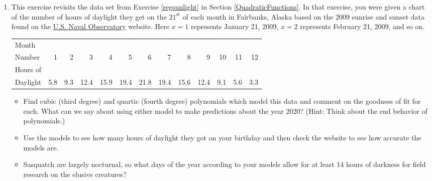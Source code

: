 \documentclass{ximera}
\begin{document}
\newpage

\begin{enumerate}
\setcounter{enumi}{\value{HW}}


\item \label{sunlighthigherorder} This exercise revisits the data set from Exercise \ref{regsunlight} in Section \ref{QuadraticFunctions}.  In that exercise, you were given a chart of the number of hours of daylight they get on the $21^{\mbox{st}}$ of each month in Fairbanks, Alaska based on the 2009 sunrise and sunset data found on the  \href{http://aa.usno.navy.mil/data/docs/RS_OneYear.php}{\underline{U.S. Naval Observatory}} website.  Here  $x = 1$ represents January 21, 2009, $x = 2$ represents February 21, 2009, and so on.  
\medskip

\small

\noindent \begin{tabular}{|l|r|r|r|r|r|r|r|r|r|r|r|r|} \hline
Month  & & & & & & & & & & & & \\
Number & 1 & 2 & 3 & 4 & 5 & 6 & 7 & 8 & 9 & 10 & 11 & 12\\ 
\hline 
Hours of  & & & & & & & & & & & & \\
Daylight & 5.8 & 9.3 & 12.4 & 15.9 & 19.4 & 21.8 & 19.4 & 15.6 & 12.4 & 9.1 & 5.6 & 3.3 \\ \hline
\end{tabular}

\normalsize

\medskip

\noindent 

\begin{itemize}

\item Find cubic (third degree) and quartic (fourth degree) polynomials which model this data and comment on the goodness of fit for each.  What can we say about using either model to make predictions about the year 2020?  (Hint: Think about the end behavior of polynomials.)  

\item Use the models to see how many hours of daylight they got on your birthday and then check the website to see how accurate the models are.  

\item Sasquatch are largely nocturnal, so what days of the year according to your models  allow for at least 14 hours of darkness for field research on the elusive creatures? 

\end{itemize}


\end{enumerate}
\end{document}
